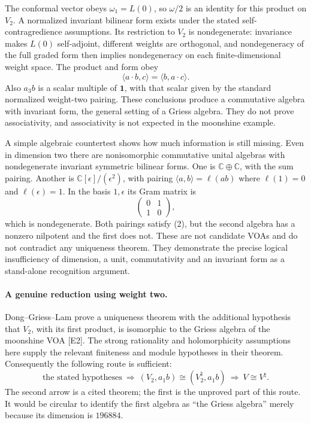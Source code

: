\documentclass[11pt]{article}
\begin{document}
The conformal vector obeys $\omega_1=L(0)$, so $\omega/2$ is an identity for this product on $V_2$. A normalized invariant bilinear form exists under the stated self-contragredience assumptions. Its restriction to $V_2$ is nondegenerate: invariance makes $L(0)$ self-adjoint, different weights are orthogonal, and nondegeneracy of the full graded form then implies nondegeneracy on each finite-dimensional weight space. The product and form obey
\[
 \langle a\cdot b,c\rangle=\langle b,a\cdot c\rangle.
                                                               \tag{2}
\]
Also $a_3b$ is a scalar multiple of $\mathbf1$, with that scalar given by the standard normalized weight-two pairing. These conclusions produce a commutative algebra with invariant form, the general setting of a Griess algebra. They do not prove associativity, and associativity is not expected in the moonshine example.

A simple algebraic countertest shows how much information is still missing. Even in dimension two there are nonisomorphic commutative unital algebras with nondegenerate invariant symmetric bilinear forms. One is $\mathbb C\oplus\mathbb C$, with the sum pairing. Another is $\mathbb C[\epsilon]/(\epsilon^2)$, with pairing $\langle a,b\rangle=\ell(ab)$ where $\ell(1)=0$ and $\ell(\epsilon)=1$. In the basis $1,\epsilon$ its Gram matrix is
\[
 \begin{pmatrix}0&1\\1&0\end{pmatrix},
\]
which is nondegenerate. Both pairings satisfy (2), but the second algebra has a nonzero nilpotent and the first does not. These are not candidate VOAs and do not contradict any uniqueness theorem. They demonstrate the precise logical insufficiency of dimension, a unit, commutativity and an invariant form as a stand-alone recognition argument.

\paragraph{A genuine reduction using weight two.}
Dong--Griess--Lam prove a uniqueness theorem with the additional hypothesis that $V_2$, with its first product, is isomorphic to the Griess algebra of the moonshine VOA [E2]. The strong rationality and holomorphicity assumptions here supply the relevant finiteness and module hypotheses in their theorem. Consequently the following route is sufficient:
\[
 \text{the stated hypotheses}
 \ \Longrightarrow\ (V_2,a_1b)\cong (V^\natural_2,a_1b)
 \ \Longrightarrow\ V\cong V^\natural.                     \tag{3}
\]
The second arrow is a cited theorem; the first is the unproved part of this route. It would be circular to identify the first algebra as ``the Griess algebra'' merely because its dimension is $196884$.
\end{document}
